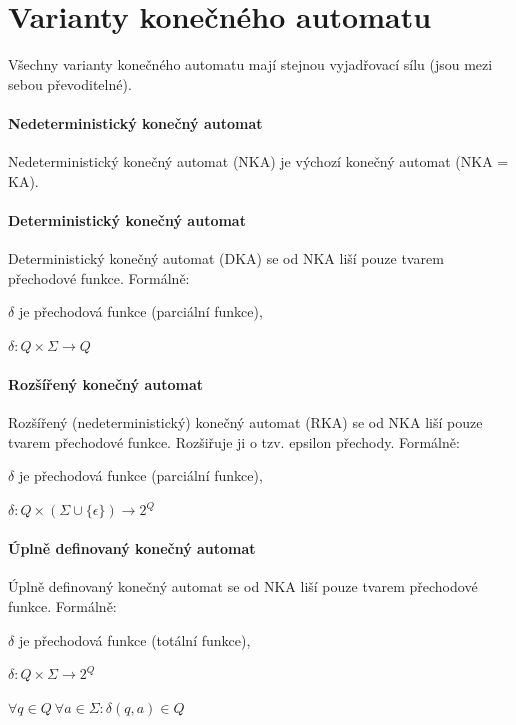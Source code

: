 
\section{Varianty konečného automatu}

Všechny varianty konečného automatu mají stejnou vyjadřovací sílu (jsou mezi sebou převoditelné).

\paragraph*{Nedeterministický konečný automat} Nedeterministický konečný automat (NKA) je výchozí konečný automat (NKA = KA).

\paragraph*{Deterministický konečný automat} Deterministický konečný automat (DKA) se od NKA liší pouze tvarem přechodové funkce. Formálně: \begin{compactitem}
    \item $\delta$ je přechodová funkce (parciální funkce), \begin{compactitem}
        \item $\delta : Q \times \Sigma \rightarrow Q$
    \end{compactitem}
\end{compactitem}

\paragraph*{Rozšířený konečný automat} Rozšířený (nedeterministický) konečný automat (RKA) se od NKA liší pouze tvarem přechodové funkce. Rozšiřuje ji o tzv. epsilon přechody. Formálně: \begin{compactitem}
    \item $\delta$ je přechodová funkce (parciální funkce), \begin{compactitem}
        \item $\delta : Q \times (\Sigma \cup \{ \epsilon \}) \rightarrow 2^Q$
    \end{compactitem}
\end{compactitem}

\paragraph*{Úplně definovaný konečný automat} Úplně definovaný konečný automat se od NKA liší pouze tvarem přechodové funkce. Formálně: \begin{compactitem}
    \item $\delta$ je přechodová funkce (totální funkce), \begin{compactitem}
        \item $\delta : Q \times \Sigma \rightarrow 2^Q$
        \item $\forall q \in Q ~ \forall a \in \Sigma : \delta(q, a) \in Q$
    \end{compactitem}
\end{compactitem}

